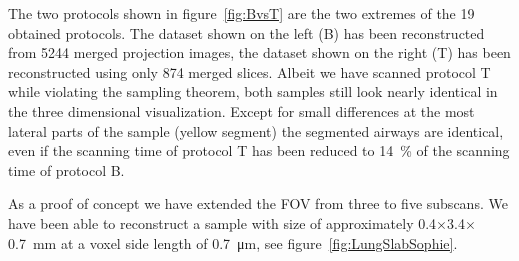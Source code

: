 The two protocols shown in figure~\ref{fig:BvsT} are the two extremes of the 19 obtained protocols. The dataset shown on the left (B) has been reconstructed from 5244 merged projection images, the dataset shown on the right (T) has been reconstructed using only 874 merged slices. Albeit we have scanned protocol T while violating the sampling theorem, both samples still look nearly identical in the three dimensional visualization. Except for small differences at the most lateral parts of the sample (yellow segment) the segmented airways are identical, even if the scanning time of protocol T has been reduced to \SI{14}{\percent} of the scanning time of protocol B.

As a proof of concept we have extended the FOV from three to five subscans. We have been able to reconstruct a sample with size of approximately 0.4\(\times\)3.4\(\times\)\SI{0.7}{\milli\meter} at a voxel side length of \SI{0.7}{\micro\meter}, see figure~\ref{fig:LungSlabSophie}.

